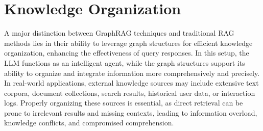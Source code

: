 \documentclass[lettersize,journal]{IEEEtran}
\newcommand{\cmark}{\ding{51}}%
\newcommand{\xmark}{\ding{55}}%
\begin{document}



\section{Knowledge Organization}\label{sec:organization}
A major distinction between GraphRAG techniques and traditional RAG methods lies in their ability to leverage graph structures for efficient knowledge organization, enhancing the effectiveness of query responses. In this setup, the LLM functions as an intelligent agent, while the graph structures support its ability to organize and integrate information more comprehensively and precisely. In real-world applications, external knowledge sources may include extensive text corpora, document collections, search results, historical user data, or interaction logs. Properly organizing these sources is essential, as direct retrieval can be prone to irrelevant results and missing contexts, leading to information overload, knowledge conflicts, and compromised comprehension.
\end{document}

